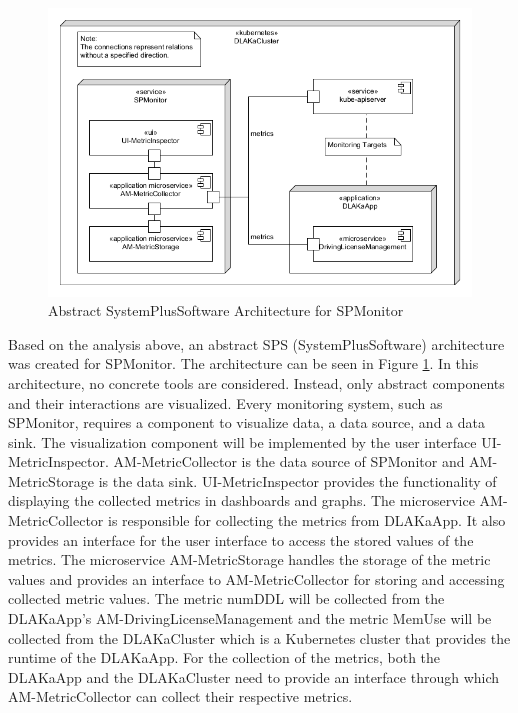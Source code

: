 \begin{figure}[tb]
  \centering
  \includegraphics[width=\textwidth]{figures/6.2_abstract_sps_spmonitor.png}
  \caption{Abstract SystemPlusSoftware Architecture for SPMonitor}
  \label{fig:abstract_sps_spmonitor}
\end{figure}

Based on the analysis above, an abstract SPS (SystemPlusSoftware) architecture
was created for SPMonitor. The architecture can be seen in Figure
\ref{fig:abstract_sps_spmonitor}. In this architecture, no concrete tools are
considered. Instead, only abstract components and their interactions are
visualized. 
Every monitoring system, such as SPMonitor, requires a component to visualize data,
a data source, and a data sink. The visualization component will be
implemented by the user interface UI-MetricInspector. AM-MetricCollector is the
data source of SPMonitor and AM-MetricStorage is the data sink.
UI-MetricInspector provides the functionality of displaying the collected
metrics in dashboards and graphs. The microservice AM-MetricCollector is
responsible for collecting the metrics from DLAKaApp. It also provides an
interface for the user interface to access the stored values of the metrics.
The microservice AM-MetricStorage handles the storage of the metric values and
provides an interface to AM-MetricCollector for storing and accessing collected
metric values. The metric numDDL will be collected from the DLAKaApp's
AM-DrivingLicenseManagement and the metric MemUse will be collected
from the DLAKaCluster which is a Kubernetes cluster that provides the runtime
of the DLAKaApp. For the collection of the metrics, both the DLAKaApp and the
DLAKaCluster need to provide an interface through which AM-MetricCollector can
collect their respective metrics.


